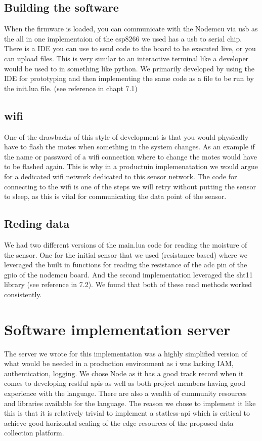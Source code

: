 \documentclass[]{uiophd}
\begin{document}
\subsection{Building the software}
When the firmware is loaded, you can communicate with the Nodemcu via usb as the all in one implementaion of the esp8266 we used has a usb to serial chip. There is a IDE you can use to send code to the board to be executed live, or you can upload files. This is very similar to an interactive terminal like a developer would be used to in something like python. We primarily developed by using the IDE for prototyping and then implementing the same code as a file to be run by the init.lua file. (see reference in chapt 7.1)
\subsection{wifi}
One of the drawbacks of this style of development is that you would physically have to flash the motes when something in the system changes. As an example if the name or password of a wifi connection where to change the motes would have to be flashed again. This is why in a productuin implemenatation we would argue for a dedicated wifi network dedicated to this sensor network. The code for connecting to the wifi is one of the steps we will retry without putting the sensor to sleep, as this is vital for communicating the data point of the sensor.
\subsection{Reding data}
We had two different versions of the main.lua code for reading the moisture of the sensor. One for the initial sensor that we used (resistance based) where we leveraged the built in functions for reading the resistance of the adc pin of the gpio of the nodemcu board. And the second implementation leveraged the sht11 library (see reference in 7.2). We found that both of these read methods worked consistently.
\section{Software implementation server}
The server we wrote for this implementation was a highly simplified version of what would be needed in a production environment as i was lacking IAM, authentication, logging. We chose Node as it has a good track record when it comes to developing restful apis as well as both project members having good experience with the language. There are also a wealth of cummunity resources and libraries available for the language. The reason we chose to implement it like this is that it is relatively trivial to implement a statless-api which is critical to achieve good horizontal scaling of the edge resources of the proposed data collection platform.
\end{document}
